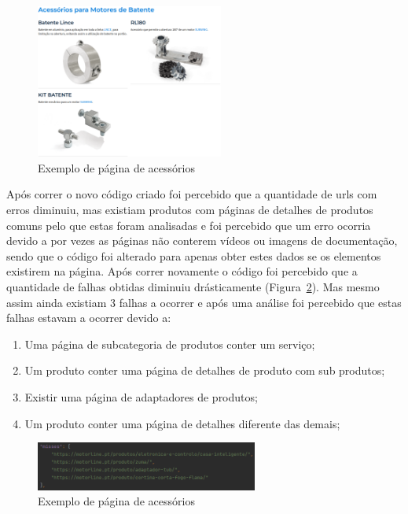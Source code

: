 \begin{figure}[htb]
    \centering
    
    \includegraphics[width=0.55\textwidth]{images/implementacao/scraper/pagina_acessorios.png}
    \caption{Exemplo de página de acessórios}
    \label{fig:58}
\end{figure}


Após correr o novo código criado foi percebido que a quantidade de urls com erros diminuiu, mas existiam produtos com páginas de detalhes de produtos comuns pelo que estas foram analisadas e foi percebido
que um erro ocorria devido a por vezes as páginas não conterem vídeos ou imagens de documentação, sendo que o código foi alterado para apenas obter estes dados se os elementos existirem na página. 
Após correr novamente o código foi percebido que a quantidade de falhas obtidas diminuiu drásticamente (Figura~\ref{fig:59}). Mas mesmo assim ainda existiam 3 falhas a ocorrer e após uma análise foi percebido que
estas falhas estavam a ocorrer devido a:

\begin{enumerate}
    \item Uma página de subcategoria de produtos conter um serviço;
    \item Um produto conter uma página de detalhes de produto com sub produtos;
    \item Existir uma página de adaptadores de produtos;
    \item Um produto conter uma página de detalhes diferente das demais;
\end{enumerate}

\begin{figure}[htb]
    \centering
    
    \includegraphics[width=0.65\textwidth]{images/implementacao/scraper/melhor_corrida.png}
    \caption{Exemplo de página de acessórios}
    \label{fig:59}
\end{figure}

